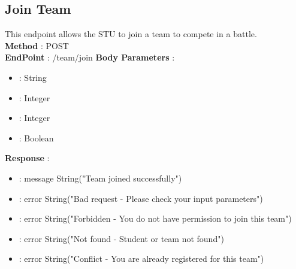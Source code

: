 \subsection*{Join Team}
This endpoint allows the STU to join a team to compete in a battle.\\
\textbf{Method} : POST \\
\textbf{EndPoint} : /team/join
\textbf{Body Parameters} :
\begin{itemize}
    \item {} : String  
    \item {} : Integer  
    \item {} : Integer  
    \item {} : Boolean 
\end{itemize}
\textbf{Response} :
\begin{itemize}
    \item {} : message String("Team joined successfully")
    \item {} : error String("Bad request - Please check your input parameters")
    \item {} : error String("Forbidden - You do not have permission to join this team")
    \item {} : error String("Not found - Student or team not found")
    \item {} : error String("Conflict - You are already registered for this team")
\end{itemize}

\newpage

